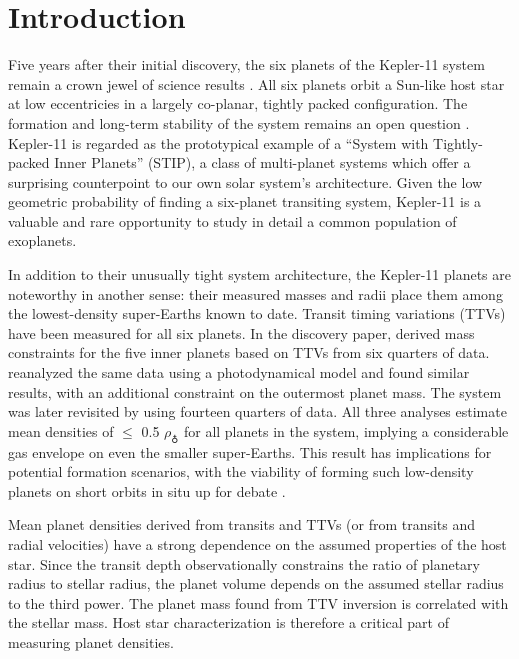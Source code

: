 \documentclass[oneside]{emulateapj}
\begin{document}
\section{Introduction}

Five years after their initial discovery, the six planets of the Kepler-11 system remain a crown jewel of \Kepler science results \citep{Lissauer2011}. All six planets orbit a Sun-like host star at low eccentricies in a largely co-planar, tightly packed configuration. The formation and long-term stability of the system remains an open question \citep[see e.g.][]{Ikoma2012, Hands2014, Mahajan2014}. Kepler-11 is regarded as the prototypical example of a ``System with Tightly-packed Inner Planets'' (STIP), a class of \Kepler multi-planet systems which offer a surprising counterpoint to our own solar system's architecture. Given the low geometric probability of finding a six-planet transiting system, Kepler-11 is a valuable and rare opportunity to study in detail a common population of exoplanets.

In addition to their unusually tight system architecture, the Kepler-11 planets are noteworthy in another sense: their measured masses and radii place them among the lowest-density super-Earths known to date. Transit timing variations (TTVs) have been measured for all six planets. In the discovery paper, \citet[][hereafter L11]{Lissauer2011} derived mass constraints for the five inner planets based on TTVs from six quarters of \Kepler data. \citet{Migaszewski2012} reanalyzed the same data using a photodynamical model and found similar results, with an additional constraint on the outermost planet mass. The system was later revisited by \citet[][hereafter L13]{Lissauer2013} using fourteen quarters of \Kepler data. All three analyses estimate mean densities of $\leq$ 0.5 $\rho_{\earth}$ for all planets in the system, implying a considerable gas envelope on even the smaller super-Earths. This result has implications for potential formation scenarios, with the viability of forming such low-density planets on short orbits in situ up for debate \citep[e.g.][]{Lopez2012, Bodenheimer2014, Howe2015}.

Mean planet densities derived from transits and TTVs (or from transits and radial velocities) have a strong dependence on the assumed properties of the host star. Since the transit depth observationally constrains the ratio of planetary radius to stellar radius, the planet volume depends on the assumed stellar radius to the third power. The planet mass found from TTV inversion is correlated with the stellar mass. Host star characterization is therefore a critical part of measuring planet densities.
\end{document}
